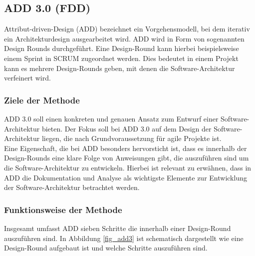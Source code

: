 \subsection{ADD 3.0 (FDD)}\label{add3}
Attribut-driven-Design (ADD) bezeichnet ein Vorgehensmodell, bei dem iterativ ein Architekturdesign ausgearbeitet wird. ADD wird in Form von sogenannten Design Rounds durchgef\"uhrt. Eine Design-Round kann hierbei beispielsweise einem Sprint in SCRUM zugeordnet werden. Dies bedeutet in einem Projekt kann es mehrere Design-Rounds geben, mit denen die Software-Architektur verfeinert wird. \\

\subsubsection{Ziele der Methode}
ADD 3.0 soll einen konkreten und genauen Ansatz zum Entwurf einer Software-Architektur bieten. Der Fokus soll bei ADD 3.0 auf dem Design der Software-Architektur liegen, die nach \cite{Cer01} Grundvoraussetzung f\"ur agile Projekte ist.\\

Eine Eigenschaft, die bei ADD besonders hervorsticht ist, dass es innerhalb der Design-Rounds eine klare Folge von Anweisungen gibt, die auszuf\"uhren sind um die Software-Architektur zu entwickeln. Hierbei ist relevant zu erw\"ahnen, dass in ADD die Dokumentation und Analyse als wichtigste Elemente zur Entwicklung der Software-Architektur betrachtet werden. \\

\subsubsection{Funktionsweise der Methode}
Insgesamt umfasst ADD sieben Schritte die innerhalb einer Design-Round auszuf\"uhren sind. In Abbildung \ref{fig_add3} ist schematisch dargestellt wie eine Design-Round aufgebaut ist und welche Schritte auszuf\"uhren sind.\\

